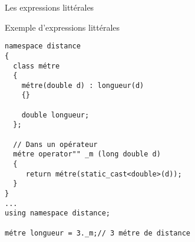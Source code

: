 \documentclass[handout,10pt]{beamer}
\begin{document}
\begin{frame}[fragile]{Les expressions littérales}

\begin{exampleblock}{Exemple d'expressions littérales}
\begin{lstlisting}
namespace distance
{
  class métre
  {
    métre(double d) : longueur(d)
    {}

    double longueur;
  };

  // Dans un opérateur
  métre operator"" _m (long double d) 
  {
     return métre(static_cast<double>(d));
  }
}
...
using namespace distance;

métre longueur = 3._m;// 3 métre de distance
\end{lstlisting}  
\end{exampleblock}
\end{frame}
\end{document}
